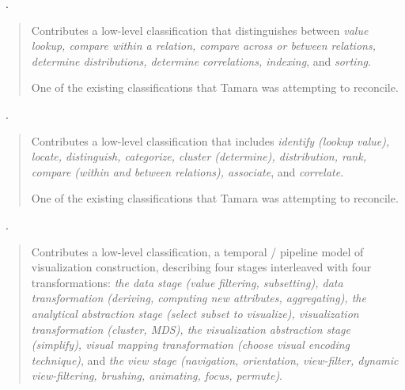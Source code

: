\begin{sloppypar}
~\cite{Roth1990}. \end{sloppypar}

\begin{quotation}
    Contributes a low-level classification that distinguishes between {\it value lookup, compare within a relation, compare across or between relations, determine distributions, determine correlations, indexing}, and {\it sorting}.
    
    One of the existing classifications that Tamara was attempting to reconcile.
\end{quotation}

\begin{sloppypar}
~\cite{Wehrend1990}. \end{sloppypar}

\begin{quotation}
    \begin{sloppypar}
    Contributes a low-level classification that includes {\it identify (lookup value), locate, distinguish, categorize, cluster (determine), distribution, rank, compare (within and between relations), associate}, and {\it correlate}.
    \end{sloppypar}
    
    One of the existing classifications that Tamara was attempting to reconcile.
\end{quotation}

\begin{sloppypar}
~\cite{Chi1998}. \end{sloppypar}

\begin{quotation}
    Contributes a low-level classification, a temporal / pipeline model of visualization construction, describing four stages interleaved with four transformations: {\it the data stage (value filtering, subsetting), data transformation (deriving, computing new attributes, aggregating), the analytical abstraction stage (select subset to visualize), visualization transformation (\eg cluster, \ac{MDS}), the visualization abstraction stage (simplify), visual mapping transformation (choose visual encoding technique)}, and {\it the view stage (navigation, orientation, view-filter, dynamic view-filtering, brushing, animating, focus, permute)}.
\end{quotation}

